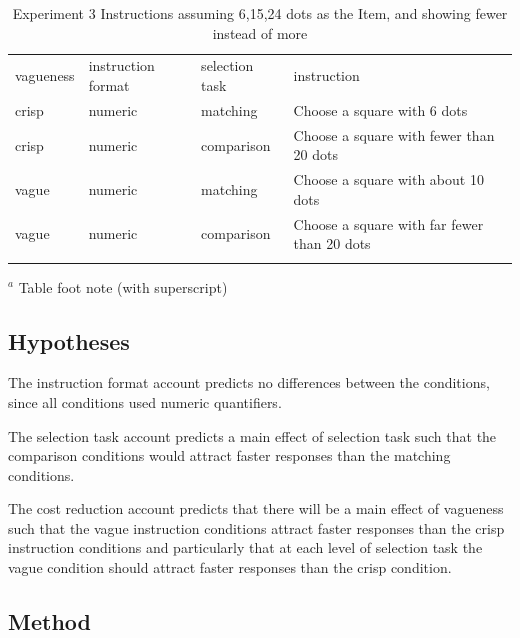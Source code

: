 \begin{table}
\caption{Experiment 3 Instructions assuming 6,15,24 dots as the Item, and showing fewer instead of more}
\label{instructionse3} 
\begin{tabular}{llll}
\hline\noalign{\smallskip}
vagueness&instruction format&selection task&instruction\\
\noalign{\smallskip}\svhline\noalign{\smallskip}
crisp & numeric&matching & Choose a square with 6 dots \\ 
crisp & numeric&comparison & Choose a square with fewer than 20 dots \\
vague & numeric&matching & Choose a square with about 10 dots \\ 
vague & numeric&comparison & Choose a square with far fewer than 20 dots \\ 
\noalign{\smallskip}\hline\noalign{\smallskip}
\end{tabular}
$^a$ Table foot note (with superscript)\\
\end{table}

\subsection{Hypotheses}

The instruction format account predicts no differences between the conditions, since all conditions used numeric quantifiers.

The selection task account predicts a main effect of selection task such that the comparison conditions would attract faster responses than the matching conditions.

The cost reduction account predicts that there will be a main effect of vagueness such that the vague instruction conditions attract faster responses than the crisp instruction conditions and particularly that at each level of selection task the vague condition should attract faster responses than the crisp condition.


\subsection{Method}

